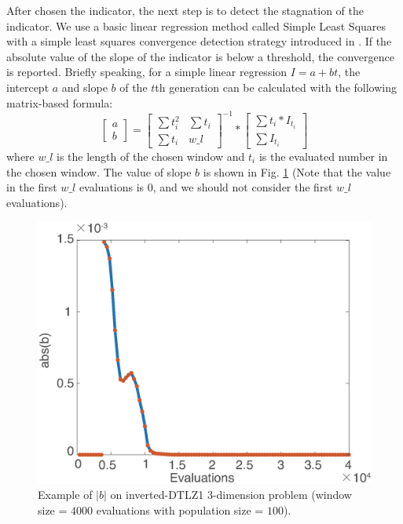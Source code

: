 \documentclass[conference]{IEEEtran}
\begin{document}
After chosen the indicator, the next step is to detect the stagnation of the indicator.
We use a basic linear regression method called Simple Least Squares\cite{SimpleLeastSquares} with a
simple least squares convergence detection strategy introduced in \cite{convergenceDetection:LSSC}.
If the absolute value of the slope of the indicator is below a threshold, the convergence is reported.
Briefly speaking, for a simple linear regression $I=a+bt$,
the intercept $a$ and slope $b$ of the $t$th generation can be calculated 
with the following matrix-based formula:
\begin{equation}\label{elr1}
  \left[
    \begin{matrix}
      a \\
      b
    \end{matrix}
  \right]
  = 
  \left[
    \begin{matrix}
      \sum t_i^2 & \sum t_i \\
      \sum t_i   & w\_ l 
    \end{matrix}
  \right]^{-1}
  *
  \left[
    \begin{matrix}
      \sum t_i * I_{t_i} \\
      \sum I_{t_i} 
    \end{matrix}
  \right]
\end{equation}
where $w\_ l$ is the length of the chosen window 
and $t_i$ is the evaluated number in the chosen window.
The value of slope $b$ is shown in Fig. \ref{wcd2} 
(Note that the value in the first $w\_ l$ evaluations is 0, 
and we should not consider the first $w\_ l$ evaluations). 
\begin{figure}[!t]
  \centering
    \includegraphics[width=\columnwidth]{FVEMOA_IDTLZ1_M3_nadir_2}
  \caption{Example of $\lvert b\rvert$ on inverted-DTLZ1 3-dimension problem
  (window size = $4000$ evaluations with population size = $100$).
  }
  \label{wcd2}
\end{figure}
\end{document}
